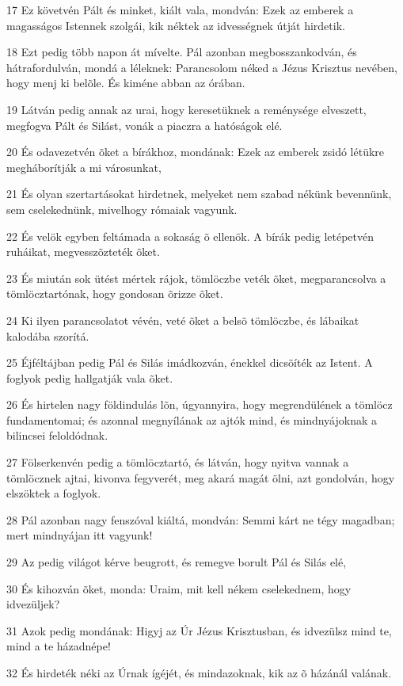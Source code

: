 \par 17 Ez követvén Pált és minket, kiált vala, mondván: Ezek az emberek a magasságos Istennek szolgái, kik néktek az idvességnek útját hirdetik.
\par 18 Ezt pedig több napon át mívelte. Pál azonban megbosszankodván, és hátrafordulván, mondá a léleknek: Parancsolom néked a Jézus Krisztus nevében, hogy menj ki belõle. És kiméne abban az órában.
\par 19 Látván pedig annak az urai, hogy keresetüknek a reménysége elveszett, megfogva Pált és Silást, vonák a piaczra a hatóságok elé.
\par 20 És odavezetvén õket a bírákhoz, mondának: Ezek az emberek zsidó létükre megháborítják a mi városunkat,
\par 21 És olyan szertartásokat hirdetnek, melyeket nem szabad nékünk bevennünk, sem cselekednünk, mivelhogy rómaiak vagyunk.
\par 22 És velök egyben feltámada a sokaság õ ellenök. A bírák pedig letépetvén ruháikat, megvesszõzteték õket.
\par 23 És miután sok ütést mértek rájok, tömlöczbe veték õket, megparancsolva a tömlöcztartónak, hogy gondosan õrizze õket.
\par 24 Ki ilyen parancsolatot vévén, veté õket a belsõ tömlöczbe, és lábaikat kalodába szorítá.
\par 25 Éjféltájban pedig Pál és Silás imádkozván, énekkel dicsõíték az Istent. A foglyok pedig hallgatják vala õket.
\par 26 És hirtelen nagy földindulás lõn, úgyannyira, hogy megrendülének a tömlöcz fundamentomai; és azonnal megnyílának az ajtók mind, és mindnyájoknak a bilincsei feloldódnak.
\par 27 Fölserkenvén pedig a tömlöcztartó, és látván, hogy nyitva vannak a tömlöcznek ajtai, kivonva fegyverét, meg akará magát ölni, azt gondolván, hogy elszöktek a foglyok.
\par 28 Pál azonban nagy fenszóval kiáltá, mondván: Semmi kárt ne tégy magadban; mert mindnyájan itt vagyunk!
\par 29 Az pedig világot kérve beugrott, és remegve borult Pál és Silás elé,
\par 30 És kihozván õket, monda: Uraim, mit kell nékem cselekednem, hogy idvezüljek?
\par 31 Azok pedig mondának: Higyj az Úr Jézus Krisztusban, és idvezülsz mind te, mind a te házadnépe!
\par 32 És hirdeték néki az Úrnak ígéjét, és mindazoknak, kik az õ házánál valának.
